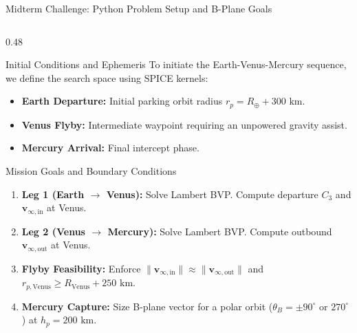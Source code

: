 \documentclass[aspectratio=169, 10pt]{beamer}
\begin{document}
\begin{frame}[fragile]{Midterm Challenge: Python Problem Setup and B-Plane Goals}
    \begin{columns}[t]
        \begin{column}{0.48\textwidth}
            \begin{block}{Initial Conditions and Ephemeris}
                \scriptsize
                To initiate the Earth-Venus-Mercury sequence, we define the search space using SPICE kernels:
                \begin{itemize}\setlength{\itemsep}{1.5pt}
                    \item \textbf{Earth Departure:} Initial parking orbit radius $r_p = R_{\oplus} + 300\text{ km}$.
                    \item \textbf{Venus Flyby:} Intermediate waypoint requiring an unpowered gravity assist.
                    \item \textbf{Mercury Arrival:} Final intercept phase.
                \end{itemize}
            \end{block}
            \vspace{-0.1cm}
            \begin{alertblock}{Mission Goals and Boundary Conditions}
                \scriptsize
                \begin{enumerate}\setlength{\itemsep}{1.5pt}
                    \item \textbf{Leg 1 (Earth $\to$ Venus):} Solve Lambert BVP. Compute departure $C_3$ and $\mathbf{v}_{\infty,\text{in}}$ at Venus.
                    \item \textbf{Leg 2 (Venus $\to$ Mercury):} Solve Lambert BVP. Compute outbound $\mathbf{v}_{\infty,\text{out}}$ at Venus.
                    \item \textbf{Flyby Feasibility:} Enforce $\|\mathbf{v}_{\infty,\text{in}}\| \approx \|\mathbf{v}_{\infty,\text{out}}\|$ and $r_{p,\text{Venus}} \ge R_{\text{Venus}} + 250\text{ km}$.
                    \item \textbf{Mercury Capture:} Size B-plane vector for a polar orbit ($\theta_B = \pm 90^\circ$ or $270^\circ$) at $h_p = 200\text{ km}$.
                \end{enumerate}
            \end{alertblock}
        \end{column}


\end{columns}
\end{frame}
\end{document}
